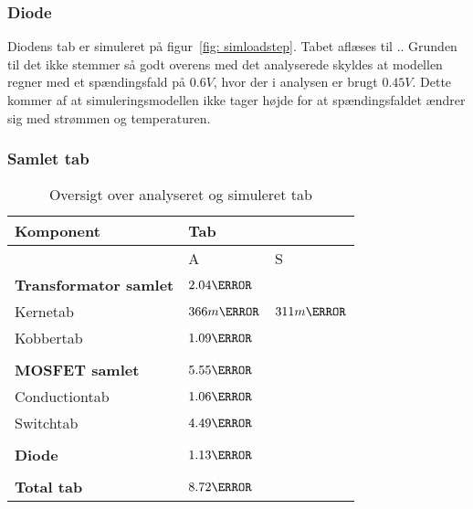 \subsubsection{Diode}
Diodens tab er simuleret på figur~\ref{fig: simloadstep}. Tabet aflæses til .. Grunden til det ikke stemmer så godt overens med det analyserede skyldes at modellen regner med et spændingsfald på $0.6V$, hvor der i analysen er brugt $0.45V$. Dette kommer af at simuleringsmodellen ikke tager højde for at spændingsfaldet ændrer sig med strømmen og temperaturen. 

\subsubsection{Samlet tab}
\begin{table}[H] 			
	\centering
	\begin{tabularx}{\textwidth}{|X|l|l|}
		\hline
		\textbf{\large Komponent} & \multicolumn{2}{|X|}{\textbf{\large Tab}} \\ \hline
		& A & S	\\ \hline
		\textbf{Transformator samlet} & $2.04\watt$ & \\ \hline 
		Kernetab & $366m\watt$ & $311m\watt$ \\ \hline
		Kobbertab & $1.09\watt$ & \\ \hline
		& &	\\ \hline
		\textbf{MOSFET samlet} & $5.55\watt$ & \\ \hline
		Conductiontab & $1.06\watt$ & \\ \hline
		Switchtab & $4.49\watt$ & \\ \hline
		& &	\\ \hline
		\textbf{Diode} & $1.13\watt$ & \\ \hline
		& &	\\ \hline
		\textbf{Total tab} & $8.72\watt$ & \\ \hline
	\end{tabularx}
	\caption{Oversigt over analyseret og simuleret tab}
	\label{tab:anasim}
\end{table}